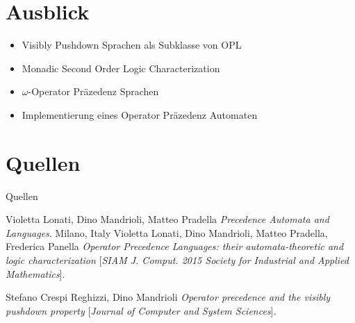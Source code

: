 \documentclass[
10pt,
pantone315, 	%
]{beamer}
\begin{document}
\section{Ausblick}
\begin{frame}[t]{\secname}
	\begin{itemize}[<+->]
	\item
	Visibly Pushdown Sprachen als Subklasse von OPL
	\item
	Monadic Second Order Logic Characterization
	\item
	$\omega$-Operator Präzedenz Sprachen
	\item
	Implementierung eines Operator Präzedenz Automaten
	\end{itemize}
\end{frame}

\nocite{*}
\section*{Quellen}
\begin{frame}{Quellen}
\begin{thebibliography}{9}
Violetta Lonati, Dino Mandrioli, Matteo Pradella
\textit{Precedence Automata and Languages}. 
Milano, Italy
Violetta Lonati, Dino Mandrioli, Matteo Pradella, Frederica Panella
\textit{Operator Precedence Languages: their automata-theoretic and logic characterization} 
[\textit{SIAM J. Comput. 2015 Society for Industrial and Applied Mathematics}]. 

 
Stefano Crespi Reghizzi, Dino Mandrioli
\textit{Operator precedence and the visibly pushdown property}
[\textit{Journal  of Computer and System Sciences}].
\end{thebibliography}
\end{frame}
\end{document}
